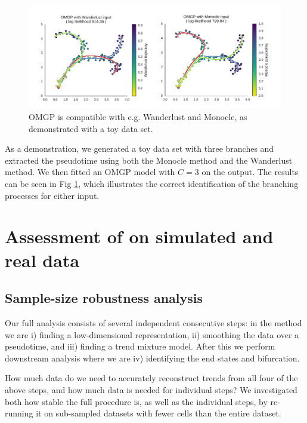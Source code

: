 \begin{figure}
    \centering
    \includegraphics[width=\textwidth]{"fig-compatibility"}
    \caption[OMGP Compatibility]{OMGP is compatible with e.g. Wanderlust and Monocle, as demonstrated with a toy data set.}
    \label{fig:compatibility}
\end{figure}

As a demonstration, we generated a toy data set with three branches and extracted the pseudotime using both the Monocle method and the Wanderlust method. We then fitted an OMGP model with $ C = 3 $ on the output. The results can be seen in Fig \ref{fig:compatibility}, which illustrates the correct identification of the branching processes for either input.

\section{Assessment of  on simulated and real data} \label{sec:assessment}

\subsection{Sample-size robustness analysis} \label{sec:gpfates-robustness}

Our full analysis consists of several independent consecutive steps: in the  method we are i) finding a low-dimensional representation, ii) smoothing the data over a pseudotime, and iii) finding a trend mixture model. After this we perform downstream analysis where we are iv) identifying the end states and bifurcation.

How much data do we need to accurately reconstruct trends from all four of the above steps, and how much data is needed for individual steps? We investigated both how stable the full procedure is, as well as the individual steps, by re-running it on sub-sampled datasets with fewer cells than the entire dataset.

